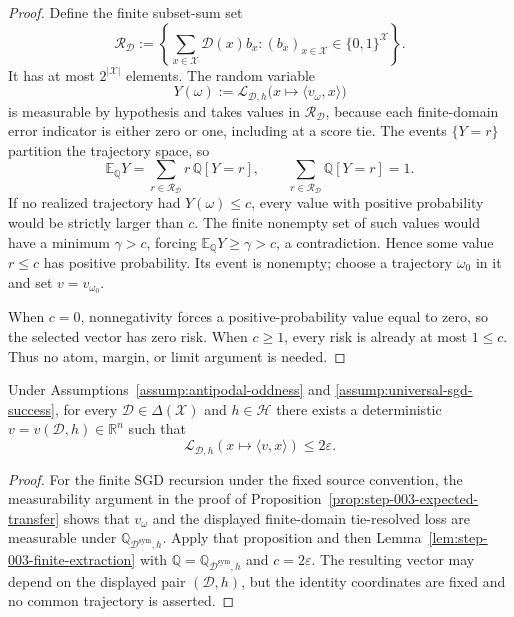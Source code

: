 \begin{proof}
Define the finite subset-sum set
\[
 \mathscr R_{\mathcal D}:=
 \left\{\sum_{x\in\mathcal X}\mathcal D(x)b_x:
 (b_x)_{x\in\mathcal X}\in\{0,1\}^{\mathcal X}\right\}.
\]
It has at most $2^{|\mathcal X|}$ elements.  The random variable
\[
Y(\omega):=\mathcal L_{\mathcal D,h}
 \bigl(x\mapsto\langle v_\omega,x\rangle\bigr)
\]
is measurable by hypothesis and takes values in $\mathscr R_{\mathcal D}$,
because each finite-domain error indicator is either zero or one, including
at a score tie.  The events $\{Y=r\}$ partition the trajectory space, so
\[
\mathbb E_{\mathbb Q}Y
=\sum_{r\in\mathscr R_{\mathcal D}}r\,\mathbb Q[Y=r],
\qquad
\sum_{r\in\mathscr R_{\mathcal D}}\mathbb Q[Y=r]=1.
\]
If no realized trajectory had $Y(\omega)\leq c$, every value with positive
probability would be strictly larger than $c$.  The finite nonempty set of
such values would have a minimum $\gamma>c$, forcing
$\mathbb E_{\mathbb Q}Y\geq\gamma>c$, a contradiction.  Hence some value
$r\leq c$ has positive probability.  Its event is nonempty; choose a
trajectory $\omega_0$ in it and set $v=v_{\omega_0}$.

When $c=0$, nonnegativity forces a positive-probability value equal to zero,
so the selected vector has zero risk.  When $c\geq1$, every risk is already
at most $1\leq c$.  Thus no atom, margin, or limit argument is needed.
\end{proof}

\begin{proposition}
\label{prop:step-003-approximate-separator}
Under Assumptions~\ref{assump:antipodal-oddness} and
\ref{assump:universal-sgd-success}, for every
$\mathcal D\in\Delta(\mathcal X)$ and $h\in\mathcal H$ there exists a
deterministic $v=v(\mathcal D,h)\in\mathbb R^n$ such that
\[
\mathcal L_{\mathcal D,h}(x\mapsto\langle v,x\rangle)\leq2\varepsilon.
\]
\end{proposition}

\begin{proof}
For the finite SGD recursion under the fixed source convention, the
measurability argument in the proof of
Proposition~\ref{prop:step-003-expected-transfer} shows that $v_\omega$ and
the displayed finite-domain tie-resolved loss are measurable under
$\mathbb Q_{\mathcal D^{\mathrm{sym}},h}$.  Apply that proposition and then
Lemma~\ref{lem:step-003-finite-extraction} with
$\mathbb Q=\mathbb Q_{\mathcal D^{\mathrm{sym}},h}$ and $c=2\varepsilon$.
The resulting vector may depend on the displayed pair $(\mathcal D,h)$, but
the identity coordinates are fixed and no common trajectory is asserted.
\end{proof}

